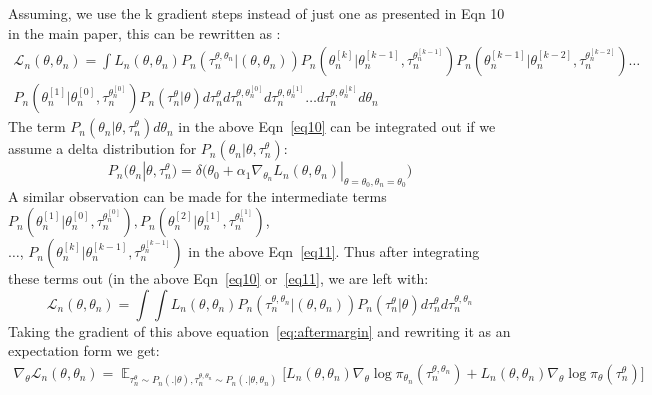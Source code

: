 \documentclass{article}
\begin{document}
Assuming, we use the k gradient steps instead of just one as presented in Eqn 10 in the main paper, this can be rewritten as :
\begin{equation}
\begin{split}
\label{eq11}
\mathcal{L}_n(\theta,\theta_n) = \int L_{n}(\theta,\theta_n) P_n(\tau_n^{\theta,\theta_n}|(\theta,\theta_n))P_n(\theta_n^{[k]}|\theta_n^{[k-1]},\tau_n^{\theta_n^{[k-1]}}) P_n(\theta_n^{[k-1]}|\theta_n^{[k-2]},\tau_n^{\theta_n^{[k-2]}}) \ldots \\ P_n(\theta_n^{[1]}|\theta_n^{[0]},\tau_n^{\theta_n^{[0]}})P_n(\tau_n^{\theta}|\theta)d\tau_n^{\theta}d\tau_n^{\theta,\theta_{n}^{[0]}}d\tau_n^{\theta,\theta_{n}^{[1]}}\ldots d\tau_n^{\theta,\theta_{n}^{[k]}}d\theta_n
\end{split}
\end{equation}
The term  $P_n(\theta_n|\theta,\tau_{n}^{\theta})d\theta_n$ in the above Eqn~\ref{eq10}  can be integrated out if we assume a delta distribution for $P_n(\theta_n|\theta,\tau_n^{\theta})$:
\begin{equation}
P_n(\theta_n|\theta,\tau_n^{\theta})=\delta \bigg(\theta_0 + \alpha_1 \nabla_{\theta_n} 
L_n(\theta,\theta_n)|_{\theta=\theta_0, \theta_n=\theta_0}\bigg)
\end{equation}
A similar observation can be made for the intermediate terms $P_n(\theta_n^{[1]}|\theta_n^{[0]},\tau_n^{\theta_n^{[0]}}),P_n(\theta_n^{[2]}|\theta_n^{[1]},\tau_n^{\theta_n^{[1]}})$,\\$\ldots$, $P_n(\theta_n^{[k]}|\theta_n^{[k-1]},\tau_n^{\theta_n^{[k-1]}})$ in the above Eqn~\ref{eq11}. 
Thus after integrating these terms out (in the above Eqn~\ref{eq10} or~\ref{eq11}, we are left with: 
\begin{equation}
\label{eq:aftermargin}
\mathcal{L}_n(\theta,\theta_n)= \int \int L_{n}(\theta,\theta_n) P_n(\tau_{n}^{\theta,\theta_n}|(\theta,\theta_n))P_n(\tau_n^{\theta}|\theta)d\tau_n^{\theta}d\tau_{n}^{\theta,\theta_n}
\end{equation}
Taking the gradient of this above equation~\ref{eq:aftermargin} and rewriting it as an expectation form we get:
\begin{equation}
\label{polgrad1}
\begin{split}
\nabla_{\theta} \mathcal{L}_n(\theta,\theta_n) =\mathop{\mathbb{E}}_{\tau_{n}^\theta \sim P_{n}(.|\theta),\tau_{n}^{\theta,\theta_n} \sim P_{n} (.|\theta,\theta_n)} \Bigg[ L_{n}(\theta,\theta_n)\nabla_{\theta} \log \pi_{\theta_{n}}(\tau_{n}^{\theta,\theta_n}) + L_{n}(\theta,\theta_n)\nabla_{\theta}\log \pi_{\theta}(\tau_{n}^{\theta})\Bigg] 
\end{split}
\end{equation}
\end{document}
